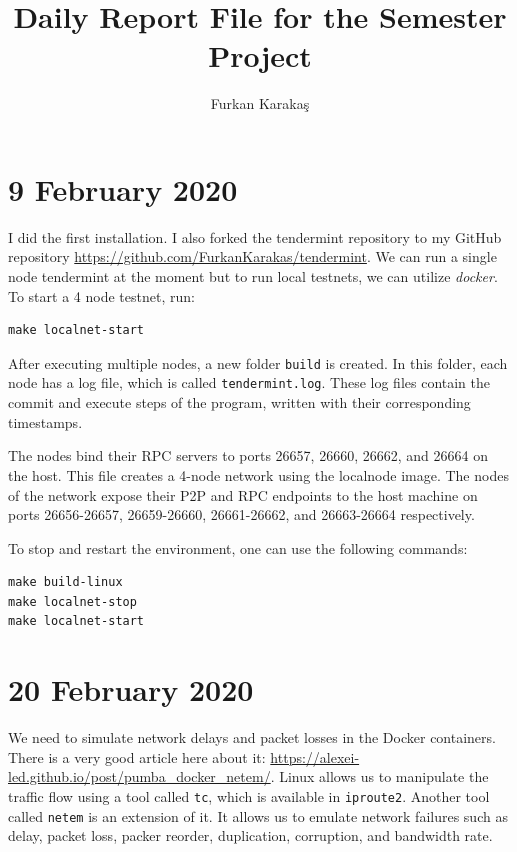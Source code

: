 \documentclass{article}
\title{\textbf{Daily Report File for the Semester Project}}
\author{Furkan Karakaş}
\begin{document}
\maketitle

\section*{9 February 2020}

I did the first installation. I also forked the tendermint repository to my 
GitHub repository \url{https://github.com/FurkanKarakas/tendermint}. We can run a single node tendermint at the moment but to run local testnets, we can utilize \textit{docker}. To start a 4 node testnet, run:

\begin{lstlisting}
make localnet-start
\end{lstlisting}

After executing multiple nodes, a new folder \texttt{build} is created. In this folder, each node has a log file, which is called \texttt{tendermint.log}. These log files contain the commit and execute steps of the program, written with their corresponding timestamps.

The nodes bind their RPC servers to ports 26657, 26660, 26662, and 26664 on the host.
This file creates a 4-node network using the localnode image.
The nodes of the network expose their P2P and RPC endpoints to the host machine on ports 26656-26657, 26659-26660, 26661-26662, and 26663-26664 respectively.

To stop and restart the environment, one can use the following commands:

\begin{lstlisting}
make build-linux
make localnet-stop
make localnet-start
\end{lstlisting}

\section*{20 February 2020}

We need to simulate network delays and packet losses in the Docker containers. There is a very good article here about it: \url{https://alexei-led.github.io/post/pumba_docker_netem/}. Linux allows us to manipulate the traffic flow using a tool called \texttt{tc}, which is available in \texttt{iproute2}. Another tool called \texttt{netem} is an extension of it. It allows us to emulate network failures such as delay, packet loss, packer reorder, duplication, corruption, and bandwidth rate.
\end{document}

